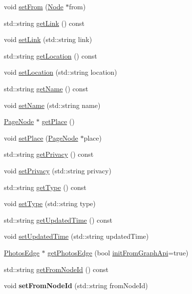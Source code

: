 \begin{DoxyCompactItemize}
\item 
void \hyperlink{classfl4cpp_1_1_album_node_a1b6abdb7c7d4b36338ee104c57ce95cf}{set\+From} (\hyperlink{classfl4cpp_1_1_node}{Node} $\ast$from)
\item 
std\+::string \hyperlink{classfl4cpp_1_1_album_node_a39117bd1859fcc15adb1e1a8f794ed7e}{get\+Link} () const 
\item 
void \hyperlink{classfl4cpp_1_1_album_node_a7df0ba4413089e1423104656755ef60d}{set\+Link} (std\+::string link)
\item 
std\+::string \hyperlink{classfl4cpp_1_1_album_node_a18a920cb044736bc1907ad0b8d76a1c3}{get\+Location} () const 
\item 
void \hyperlink{classfl4cpp_1_1_album_node_acaf5fd35820ba8716075733019d8a310}{set\+Location} (std\+::string location)
\item 
std\+::string \hyperlink{classfl4cpp_1_1_album_node_a31c5c55748649108ec8dcec8873cc6ba}{get\+Name} () const 
\item 
void \hyperlink{classfl4cpp_1_1_album_node_a6febeb70f67a773c0ac81ce0b7fee637}{set\+Name} (std\+::string name)
\item 
\hyperlink{classfl4cpp_1_1_page_node}{Page\+Node} $\ast$ \hyperlink{classfl4cpp_1_1_album_node_a20213c9b0e69c67ab78cc3b1f19ac3f7}{get\+Place} ()
\item 
void \hyperlink{classfl4cpp_1_1_album_node_acf387b0dfa8f9f4ae75888dfe8aaf374}{set\+Place} (\hyperlink{classfl4cpp_1_1_page_node}{Page\+Node} $\ast$place)
\item 
std\+::string \hyperlink{classfl4cpp_1_1_album_node_a3dd156faf6fa7bc4d9661918a1f16ee3}{get\+Privacy} () const 
\item 
void \hyperlink{classfl4cpp_1_1_album_node_a6c4834118080b248af476d7b177a4841}{set\+Privacy} (std\+::string privacy)
\item 
std\+::string \hyperlink{classfl4cpp_1_1_album_node_afd5937be8f90bda62cce4432b34d758d}{get\+Type} () const 
\item 
void \hyperlink{classfl4cpp_1_1_album_node_af559b47c8f6c485a430ff606400b40b9}{set\+Type} (std\+::string type)
\item 
std\+::string \hyperlink{classfl4cpp_1_1_album_node_a4e8260b40c1f40a05d141f3cb622fe4d}{get\+Updated\+Time} () const 
\item 
void \hyperlink{classfl4cpp_1_1_album_node_afa83c30dc2aa06f0fafb2de20daaeb8d}{set\+Updated\+Time} (std\+::string updated\+Time)
\item 
\hyperlink{classfl4cpp_1_1_photos_edge}{Photos\+Edge} $\ast$ \hyperlink{classfl4cpp_1_1_album_node_a74ed9093dfad5e047cebd5f45a9a2952}{get\+Photos\+Edge} (bool \hyperlink{classfl4cpp_1_1_node_a1dd4594ffd7eb08e9e8c5031d2109a59}{init\+From\+Graph\+Api}=true)
\item 
std\+::string \hyperlink{classfl4cpp_1_1_album_node_a0756b5cfae7f3e26bea0ef3753efc88f}{get\+From\+Node\+Id} () const 
\item 
void {\bfseries set\+From\+Node\+Id} (std\+::string from\+Node\+Id)\hypertarget{classfl4cpp_1_1_album_node_ab2a57bff493da859b3fdb05fedb8ea29}{}\label{classfl4cpp_1_1_album_node_ab2a57bff493da859b3fdb05fedb8ea29}


\end{DoxyCompactItemize}
